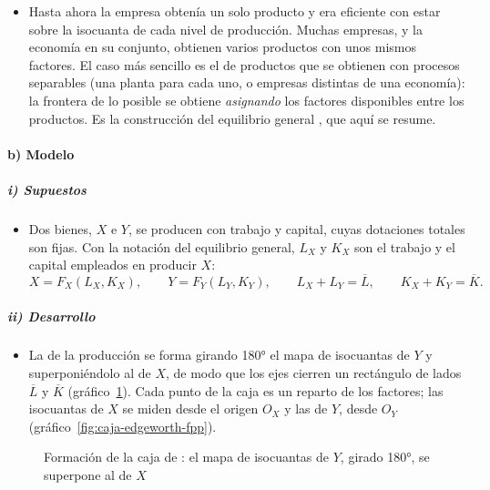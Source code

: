 \documentclass[11pt]{article}
\begin{document}
\begin{itemize}
\item Hasta ahora la empresa obtenía un solo producto y era eficiente con estar sobre la isocuanta de cada nivel de producción. Muchas empresas, y la economía en su conjunto, obtienen varios productos con unos mismos factores. El caso más sencillo es el de productos que se obtienen con procesos separables (una planta para cada uno, o empresas distintas de una economía): la frontera de lo posible se obtiene \emph{asignando} los factores disponibles entre los productos. Es la construcción del equilibrio general , que aquí se resume.
\end{itemize}

\paragraph{b) Modelo}

\subparagraph{i) Supuestos}

\begin{itemize}
\item Dos bienes, $X$ e $Y$, se producen con trabajo y capital, cuyas dotaciones totales son fijas. Con la notación del equilibrio general, $L_X$ y $K_X$ son el trabajo y el capital empleados en producir $X$:
  \begin{equation}
  X=F_X(L_X,K_X),\qquad Y=F_Y(L_Y,K_Y),\qquad L_X+L_Y=\overline{L},\qquad K_X+K_Y=\overline{K}. \label{eq:caja-produccion}
  \end{equation}
\end{itemize}

\subparagraph{ii) Desarrollo}

\begin{itemize}
\item La  de la producción se forma girando 180° el mapa de isocuantas de $Y$ y superponiéndolo al de $X$, de modo que los ejes cierren un rectángulo de lados $\overline{L}$ y $\overline{K}$ (gráfico~\ref{fig:formacion-caja}). Cada punto de la caja es un reparto de los factores; las isocuantas de $X$ se miden desde el origen $O_X$ y las de $Y$, desde $O_Y$ (gráfico~\ref{fig:caja-edgeworth-fpp}).
\end{itemize}

\begin{figure}[H]
\centering
\caption{Formación de la caja de : el mapa de isocuantas de $Y$, girado 180°, se superpone al de $X$}\label{fig:formacion-caja}
\end{figure}
\end{document}
